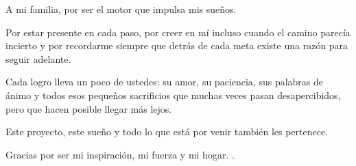 \documentclass[
    11pt,
    spanish,
    singlespacing,
    parskip,
    headsepline,
    bookmarks=true,
    unicode=true,
    pdftoolbar=true,
    pdfmenubar=true,
    pdffitwindow=false,
    colorlinks=true,
    linkcolor=blue,
    citecolor=blue,
    urlcolor=blue
]{MastersDoctoralThesis}
\begin{document}



\frontmatter %
\pagestyle{plain} %


\begin{abstract}
\addchaptertocentry{\abstractname} %
En la presente memoria se describe el desarrollo de un sistema de inteligencia artificial enfocado en la predicción de tareas de imaginación motriz usando señales de electroencefalografía. Este trabajo busca dejar una base técnica para el desarrollo de sistemas de interacción cerebro-computador en imaginación motriz para predecir la intención de movimiento en usuarios.                                                     

Para su implementación fueron necesarios los conocimientos adquiridos en la especialización incluidos procesamiento y análisis de datos, aprendizaje automático, redes neuronales y operaciones.
\end{abstract}

\begin{acknowledgements}
\vspace{1.5cm}
A mi familia, por ser el motor que impulsa mis sueños.

Por estar presente en cada paso, por creer en mí incluso cuando el camino parecía incierto y por recordarme siempre que detrás de cada meta existe una razón para seguir adelante.

Cada logro lleva un poco de ustedes: su amor, su paciencia, sus palabras de ánimo y todos esos pequeños sacrificios que muchas veces pasan desapercibidos, pero que hacen posible llegar más lejos.

Este proyecto, este sueño y todo lo que está por venir también les pertenece.

Gracias por ser mi inspiración, mi fuerza y mi hogar.
.
\end{acknowledgements}
\end{document}
